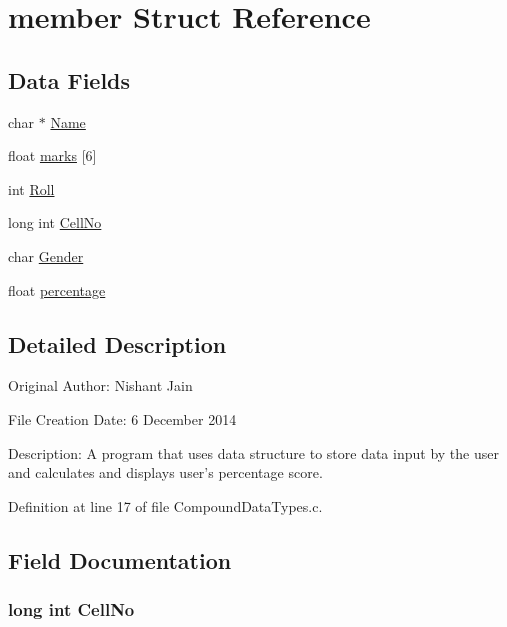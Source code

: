 \hypertarget{structmember}{\section{member Struct Reference}
\label{structmember}
}
\subsection*{Data Fields}
\begin{DoxyCompactItemize}
\item 
char $\ast$ \hyperlink{structmember_a5e6182c030324511dd82e9fa1a0ab071}{Name}
\item 
float \hyperlink{structmember_ad4c3e5c25307fd49af034db07064803a}{marks} \mbox{[}6\mbox{]}
\item 
int \hyperlink{structmember_abf08303c7c1c86949317530985b66f65}{Roll}
\item 
long int \hyperlink{structmember_ab06b37fd487ea9df9d12601461704dc2}{Cell\+No}
\item 
char \hyperlink{structmember_afbcfc79081bb5d32e3e787e11b880fda}{Gender}
\item 
float \hyperlink{structmember_a34c5b668208550b3c34a2ed0eec615f5}{percentage}
\end{DoxyCompactItemize}


\subsection{Detailed Description}




Original Author\+: Nishant Jain

File Creation Date\+: 6 December 2014

Description\+: A program that uses data structure to store data input by the user and calculates and displays user's percentage score. 

Definition at line 17 of file Compound\+Data\+Types.\+c.



\subsection{Field Documentation}
\hypertarget{structmember_ab06b37fd487ea9df9d12601461704dc2}{
\subsubsection[{Cell\+No}]{\setlength{\rightskip}{0pt plus 5cm}long int Cell\+No}}\label{structmember_ab06b37fd487ea9df9d12601461704dc2}


